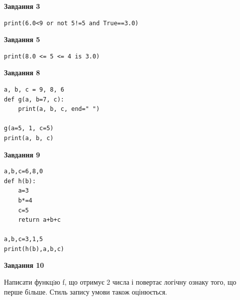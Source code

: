 \documentclass[12pt, ukrainian]{article}
\begin{document}
{\begin {large}
\begin{minipage}[t]{7.5cm}
\end{minipage}
\vline \hspace{6mm}
\begin{minipage}[t]{10.5cm}

\begin{center}
\textbf{Завдання 3}
\end{center}

\begin{verbatim}
print(6.0<9 or not 5!=5 and True==3.0)
\end{verbatim}



\begin{center}
\textbf{Завдання 5}
\end{center}

\begin{verbatim}
print(8.0 <= 5 <= 4 is 3.0)
\end{verbatim}



\begin{center}
\textbf{Завдання 8}
\end{center}

\begin{verbatim}
a, b, c = 9, 8, 6
def g(a, b=7, c):
    print(a, b, c, end=" ")

g(a=5, 1, c=5)
print(a, b, c)
\end{verbatim}



\begin{center}
\textbf{Завдання 9}
\end{center}

\begin{verbatim}
a,b,c=6,8,0
def h(b):
    a=3
    b*=4
    c=5
    return a+b+c

a,b,c=3,1,5
print(h(b),a,b,c)
\end{verbatim}



\begin{center}
\textbf{Завдання 10}
\end{center}

Написати функцiю f, що отримує 2 числа і повертає логічну ознаку того, що перше бiльше. Стиль запису умови також оцінюється.\par

\end{minipage}

\end {large}}
\newpage
\end{document}
